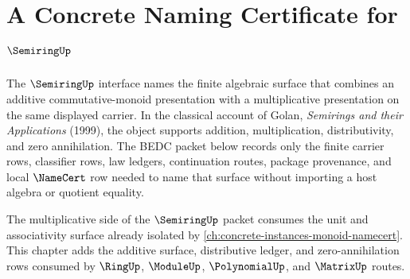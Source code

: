 \chapter{A Concrete Naming Certificate for $\SemiringUp$}
\label{ch:concrete-instances-semiring-namecert}

The $\SemiringUp$ interface names the finite algebraic surface that combines
an additive commutative-monoid presentation with a multiplicative presentation
on the same displayed carrier. In the classical account of Golan,
\emph{Semirings and their Applications} (1999), the object supports addition,
multiplication, distributivity, and zero annihilation. The BEDC packet below
records only the finite carrier rows, classifier rows, law ledgers,
continuation routes, package provenance, and local $\NameCert$ row needed to
name that surface without importing a host algebra or quotient equality.

The multiplicative side of the $\SemiringUp$ packet consumes the unit and
associativity surface already isolated by
\autoref{ch:concrete-instances-monoid-namecert}. This chapter adds the
additive surface, distributive ledger, and zero-annihilation rows consumed by
$\RingUp$, $\ModuleUp$, $\PolynomialUp$, and $\MatrixUp$ routes.


